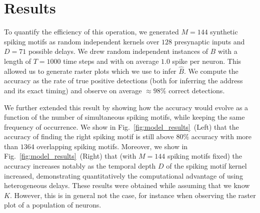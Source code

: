\documentclass[runningheads]{llncs}
\newcommand{\presynaddr}{a} %
\newcommand{\postsynaddr}{b} %
\newcommand{\arank}{r} %
\newcommand{\bias}{b} %
\newcommand{\synapse}{\mathcal{S}} %
\newcommand{\activeweights}{\mathcal{W}}
\newcommand{\timev}{t} %
\newcommand{\Nclass}{N_\text{class}} %
\newcommand{\kernel}{K} %
\newcommand{\Nspeed}{N_v}
\newcommand{\fig}[1]{Fig.~\ref{fig:#1}}%
\begin{document}
%
%
%
\section{Results}
%
To quantify the efficiency of this operation, we generated $M=144$ synthetic spiking motifs as random independent kernels over $128$ presynaptic inputs and $D=71$ possible delays. We drew random independent instances of $B$ with a length of $T=1000$ time steps and with on average $1.0$ spike per neuron. This allowed us to generate raster plots which we use to infer $\hat{B}$. We compute the accuracy as the rate of true positive detections (both for inferring the address and its exact timing) and observe on average $\approx 98\%$ correct detections.

We further extended this result by showing how the accuracy would evolve as a function of the number of simultaneous spiking motifs, while keeping the same frequency of occurrence. We show in \fig{model_results}~(Left) that the accuracy of finding the right spiking motif is still above $80\%$ accuracy with more than $1364$ overlapping spiking motifs. Moreover, we show in \fig{model_results}~(Right) that (with $M=144$ spiking motifs fixed) the accuracy increases notably as the temporal depth $D$ of the spiking motif kernel increased, demonstrating quantitatively the computational advantage of using heterogeneous delays. These results were obtained while assuming that we know $\kernel$. However, this is in general not the case, for instance when observing the raster plot of a population of neurons. 
\end{document}
